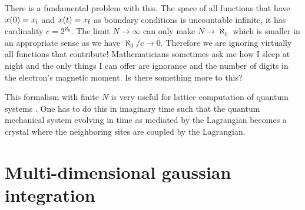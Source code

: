 \documentclass[11pt, english, fleqn, DIV=15, headinclude]{scrartcl}
\begin{document}
\begin{question}
    There is a fundamental problem with this. The space of all functions that
    have $x(0) = x_\mathrm i$ and $x(t) = x_\mathrm f$ as boundary conditions is uncountable
    infinite, it has cardinality $c = 2^{\aleph_0}$. The limit $N \to \infty$
    can only make $N \to \aleph_0$ which is smaller in an appropriate sense as
    we have $\aleph_0/c \to 0$. Therefore we are ignoring virtually all
    functions that contribute! Mathematicians sometimes ask me how I sleep at
    night and the only things I can offer are ignorance and the number of
    digits in the electron's magnetic moment. Is there something more to this?
\end{question}


This formalism with finite $N$ is very useful for lattice computation of
quantum systems \parencite{Creutz/Statistical_Approach_QM}. One has to do this
in imaginary time such that the quantum mechanical system evolving in time as
mediated by the Lagrangian becomes a crystal where the neighboring sites are
coupled by the Lagrangian.

\section{Multi-dimensional gaussian integration}
\label{homework:2}
\end{document}

